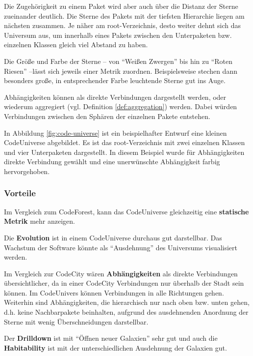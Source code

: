 Die Zugehörigkeit zu einem Paket wird aber auch über die Distanz der Sterne zueinander deutlich. Die Sterne des Pakets mit der tiefsten Hierarchie liegen am nächsten zusammen. Je näher am root-Verzeichnis, desto weiter dehnt sich das Universum aus, um innerhalb eines Pakets zwischen den Unterpaketen bzw. einzelnen Klassen gleich viel Abstand zu haben.

Die Größe und Farbe der Sterne -- von "`Weißen Zwergen"' bis hin zu "`Roten Riesen"' --lässt sich jeweils einer Metrik zuordnen. Beispielsweise stechen dann besonders große, in entsprechender Farbe leuchtende Sterne gut ins Auge.

Abhängigkeiten können als direkte Verbindungen dargestellt werden, oder wiederum aggregiert (vgl. Definition \ref{def:aggregation}) werden. Dabei würden Verbindungen zwischen den Sphären der einzelnen Pakete entstehen.

In Abbildung \ref{fig:code-universe} ist ein beispielhafter Entwurf eine kleinen CodeUniverse abgebildet. Es ist das root-Verzeichnis mit zwei einzelnen Klassen und vier Unterpaketen dargestellt. In diesem Beispiel wurde für Abhängigkeiten direkte Verbindung gewählt und eine unerwünschte Abhängigkeit farbig hervorgehoben.

\subsubsection*{Vorteile}
Im Vergleich zum CodeForest, kann das CodeUniverse gleichzeitig eine \textbf{statische Metrik} mehr anzeigen.

Die \textbf{Evolution} ist in einem CodeUniverse durchaus gut darstellbar. Das Wachstum der Software könnte als "`Ausdehnung"' des Universums visualisiert werden.

Im Vergleich zur CodeCity wären \textbf{Abhängigkeiten} als direkte Verbindungen übersichtlicher, da in einer CodeCity Verbindungen nur überhalb der Stadt sein können. Im CodeUnivers können Verbindungen in alle Richtungen gehen. Weiterhin sind Abhängigkeiten, die hierarchisch nur nach oben bzw. unten gehen, d.h. keine Nachbarpakete beinhalten, aufgrund des ausdehnenden Anordnung der Sterne mit wenig Überschneidungen darstellbar.

Der \textbf{Drilldown} ist mit "`Öffnen neuer Galaxien"' sehr gut und auch die \textbf{Habitability} ist mit der unterschiedlichen Ausdehnung der Galaxien gut.

